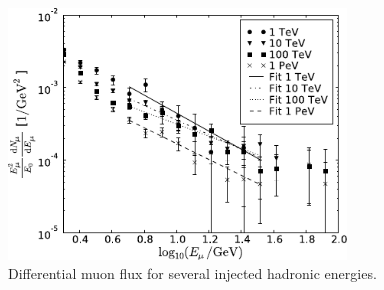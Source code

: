 \begin{figure}
    \centering
    \includegraphics[width=0.8\textwidth]{./images/muon_flux_hadronic_shower.pdf}
    \caption{Differential muon flux for several injected hadronic energies. \cite{Panknin09ICRC}}
    \label{fig:mu_flux_hadr_shower}
\end{figure}
